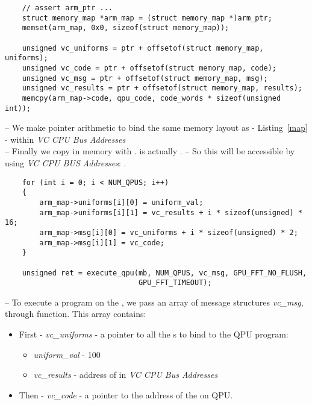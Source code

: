 \begin{lstlisting}
    // assert arm_ptr ...
    struct memory_map *arm_map = (struct memory_map *)arm_ptr;
    memset(arm_map, 0x0, sizeof(struct memory_map));

    unsigned vc_uniforms = ptr + offsetof(struct memory_map, uniforms);
    unsigned vc_code = ptr + offsetof(struct memory_map, code);
    unsigned vc_msg = ptr + offsetof(struct memory_map, msg);
    unsigned vc_results = ptr + offsetof(struct memory_map, results);
    memcpy(arm_map->code, qpu_code, code_words * sizeof(unsigned int));
\end{lstlisting}
-- We make pointer arithmetic to bind the same memory layout as  - Listing~\ref{map} -  within \emph{VC CPU Bus Addresses} \\
-- Finally we copy  in memory with .  is actually .
-- So this  will be accessible by  using \emph{VC CPU BUS Addresses}: .
\newpage


\begin{lstlisting}
    for (int i = 0; i < NUM_QPUS; i++)
    {
        arm_map->uniforms[i][0] = uniform_val;
        arm_map->uniforms[i][1] = vc_results + i * sizeof(unsigned) * 16;
        arm_map->msg[i][0] = vc_uniforms + i * sizeof(unsigned) * 2;
        arm_map->msg[i][1] = vc_code;
    }

    unsigned ret = execute_qpu(mb, NUM_QPUS, vc_msg, GPU_FFT_NO_FLUSH,
                               GPU_FFT_TIMEOUT);
\end{lstlisting}
-- To execute a \qpu{} program on the , we pass an array of message structures \emph{vc\_msg}, through  \mail{} function. This array contains:
\begin{itemize}
	\item First - \emph{vc\_uniforms} - a pointer to all the \uni{}s to bind to the QPU program:
	\begin{itemize}
		\item \emph{uniform\_val} - 100
		\item \emph{vc\_results} - address of  in \emph{VC CPU Bus Addresses}
	\end{itemize}
\item Then - \emph{vc\_code} - a pointer to the address of the  on QPU.
\end{itemize}



